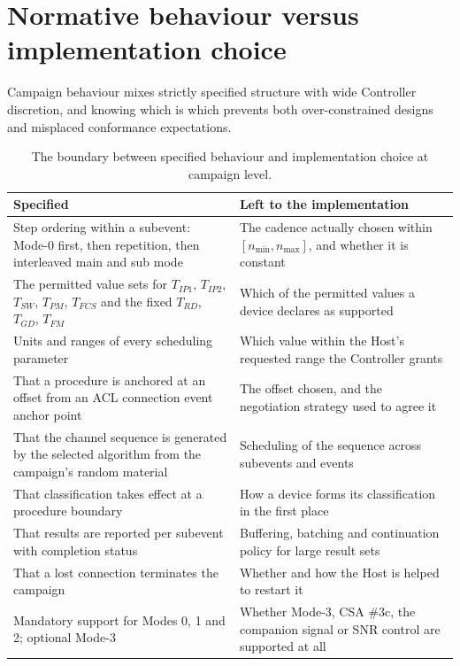 \documentclass[11pt,a4paper]{article}
\newcommand{\Trd}{T_{RD}}
\newcommand{\Tip}{T_{IP1}}
\newcommand{\Tipp}{T_{IP2}}
\newcommand{\Tfcs}{T_{FCS}}
\newcommand{\Tgd}{T_{GD}}
\newcommand{\Tfm}{T_{FM}}
\newcommand{\Tsw}{T_{SW}}
\newcommand{\Tpm}{T_{PM}}
\begin{document}
\section{Normative behaviour versus implementation choice}
\label{sec:normative}

Campaign behaviour mixes strictly specified structure with wide Controller discretion, and knowing
which is which prevents both over-constrained designs and misplaced conformance expectations.

\begin{table}[htb]
\caption{The boundary between specified behaviour and implementation choice at campaign level.}
\label{tab:normative}
\centering\small
\begin{tabular}{@{}L{62mm}L{62mm}@{}}
\toprule
Specified & Left to the implementation \\
\midrule
Step ordering within a subevent: Mode-0 first, then repetition, then interleaved main and sub mode
  & The cadence actually chosen within $[n_{\min}, n_{\max}]$, and whether it is constant \\
The permitted value sets for $\Tip$, $\Tipp$, $\Tsw$, $\Tpm$, $\Tfcs$ and the fixed $\Trd$, $\Tgd$,
  $\Tfm$
  & Which of the permitted values a device declares as supported \\
Units and ranges of every scheduling parameter
  & Which value within the Host's requested range the Controller grants \\
That a procedure is anchored at an offset from an ACL connection event anchor point
  & The offset chosen, and the negotiation strategy used to agree it \\
That the channel sequence is generated by the selected algorithm from the campaign's random material
  & Scheduling of the sequence across subevents and events \\
That classification takes effect at a procedure boundary
  & How a device forms its classification in the first place \\
That results are reported per subevent with completion status
  & Buffering, batching and continuation policy for large result sets \\
That a lost connection terminates the campaign
  & Whether and how the Host is helped to restart it \\
Mandatory support for Modes 0, 1 and 2; optional Mode-3
  & Whether Mode-3, CSA \#3c, the companion signal or SNR control are supported at all \\
\bottomrule
\end{tabular}
\end{table}
\end{document}
